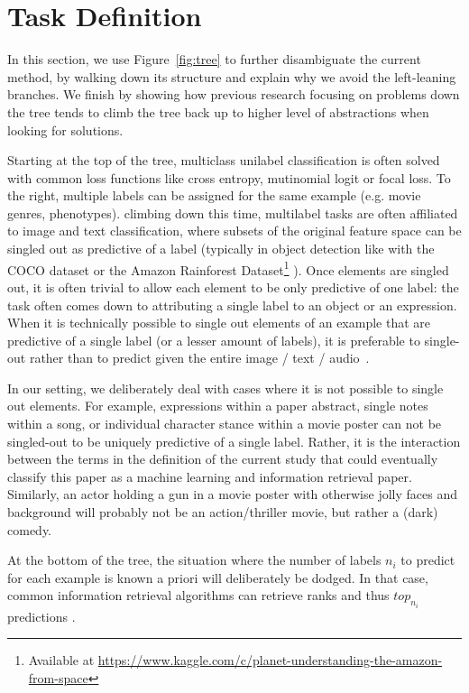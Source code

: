 
\section{Task Definition}

In this section, we use Figure~\ref{fig:tree} to further disambiguate the current method, by walking down its structure and explain why we avoid the left-leaning branches. We finish by showing how previous research focusing on problems down the tree tends to climb the tree back up to higher level of abstractions when looking for solutions.

Starting at the top of the tree, multiclass unilabel classification is often solved with common loss functions like cross entropy, mutinomial logit or focal loss. To the right, multiple labels can be assigned for the same example (e.g. movie genres, phenotypes). climbing down this time, multilabel tasks are often affiliated to image and text classification, where subsets of the original feature space can be singled out as predictive of a label (typically in object detection like with the COCO dataset  \cite{COCO} or the Amazon Rainforest Dataset\footnote{Available at \url{https://www.kaggle.com/c/planet-understanding-the-amazon-from-space}} ). Once elements are singled out, it is often trivial to allow each element to be only predictive of one label: the task often comes down to attributing a single label to an object or an expression. When it is technically possible to single out elements of an example that are predictive of a single label (or a lesser amount of labels), it is preferable to single-out rather than to predict given the entire image / text / audio~\cite{multiInstanceMultiLabel}.

In our setting, we deliberately deal with cases where it is not possible to single out elements. For example, expressions within a paper abstract, single notes within a song, or individual character stance within a movie poster can not be singled-out to be uniquely predictive of a single label. Rather, it is the interaction between the terms in the definition of the current study that could eventually classify this paper as a machine learning and information retrieval paper. Similarly, an actor holding a gun in a movie poster with otherwise jolly faces and background will probably not be an action/thriller movie, but rather a (dark) comedy. 

At the bottom of the tree, the situation where the number of labels $n_i$ to predict for each example is known a priori will deliberately be dodged. In that case, common information retrieval algorithms can retrieve ranks and thus $top_{n_i}$ predictions .

